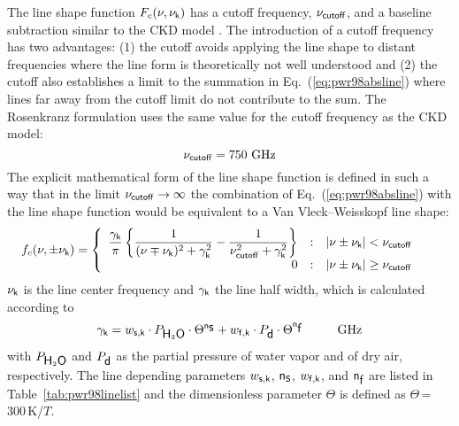 {The line shape function $F_{c}(\nu,\nu_{\sf k})$ has a cutoff frequency, $\nu_{\sf cutoff}$,
and a baseline subtraction similar to the CKD model \cite{clough:89}.
The introduction of a cutoff frequency has two advantages: (1) the
cutoff avoids applying the line shape to distant frequencies where the 
line form is theoretically not well understood and (2) the cutoff also
establishes a limit to the summation in Eq.~(\ref{eq:pwr98absline}) where lines
far away from the cutoff limit do not contribute to the sum.  
The Rosenkranz formulation uses the same value for
the cutoff frequency as the CKD model:
\begin{equation} 
 \label{cutoff}
 \nu_{\sf cutoff} = 750\mbox{ GHz}
\end{equation}
%
The explicit mathematical form of the line shape function is defined 
in such a way that in the limit $\nu_{\sf cutoff} \rightarrow \infty$ the 
combination of Eq.~(\ref{eq:pwr98absline}) with the line shape function would 
be equivalent to a Van Vleck--Weisskopf \citep{vanvleck:45} line shape: 
\begin{equation}
 \label{eq:pwr98lineshape}
 \hspace*{-5mm}\shapefpm = 
   \left \{ \begin{array}{r@{\quad:\quad}l} 
   \displaystyle{\frac{\gamk}{\pi}} 
   \left \{ \displaystyle{\frac{1}{(\nu \mp \nuk)^2 + \gamk^2}} - 
   \displaystyle{\frac{1}{\nucut^2 + \gamk^2}} \right \}
   & |\nu \pm \nuk| < \nucut \\ 
   0 & |\nu \pm \nuk| \geq \nucut
                       \end{array} \right.
\end{equation}
$\nu_{\sf k}$ is the line center frequency and $\gamma_{\sf k}$ the line
half width, which is calculated according to 
\begin{equation}
 \label{eq:pwr98gamma}
 \gamk = \ws \cdot \phzo \cdot \Theta^{\xs} + 
         \wf \cdot \pda  \cdot \Theta^{\xf}\hspace*{10mm}\mbox{GHz}
\end{equation}
with $P_{\mbox{\sf H}_{2}\mbox{\sf O}}$ and $P_{\mbox{\sf d}}$ as the partial pressure of water vapor and of 
dry air, respectively. The line depending parameters $w_{\sf s,k}$, ${\sf n}_{\mbox{\sf s}}$, 
$w_{\sf f,k}$, and ${\sf n}_{\mbox{\sf f}}$ are listed in Table~\ref{tab:pwr98linelist} and the 
dimensionless parameter $\Theta$ is defined as $\Theta$\,=\,300\,K/$T$.

}
